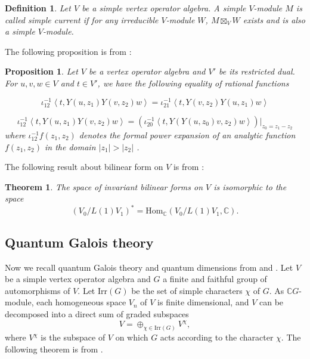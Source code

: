 \documentclass{article}
\newtheorem{theorem}[lemma]{Theorem}
\newtheorem{proposition}[lemma]{Proposition}
\newtheorem{definition}[lemma]{Definition}
\begin{document}
	\begin{definition} Let $V$ be a simple vertex operator algebra.
		A simple $V$-module $M$ is called \emph{simple current} if for
		any irreducible $V$-module $W$, $M\boxtimes_{V}W$ exists and is
		also a simple $V$-module. \end{definition}
	
	The following proposition is from \cite{FHL}:
	
	\begin{proposition} \label{extension property} Let $V$ be a vertex
		operator algebra and $V'$ be its restricted dual. For $u,v,w\in V$
		and $t\in V'$, we have the following equality of rational functions
		
		\begin{equation}
			\iota_{12}^{-1}\left\langle t,Y\left(u,z_{1}\right)Y\left(v,z_{2}\right)w\right\rangle =\iota_{21}^{-1}\left\langle t,Y\left(v,z_{2}\right)Y\left(u,z_{1}\right)w\right\rangle \label{communitivity}
		\end{equation}
		
		\begin{equation}
			\iota_{12}^{-1}\left\langle t,Y\left(u,z_{1}\right)Y\left(v,z_{2}\right)w\right\rangle =\left(\iota_{20}^{-1}\left\langle t,Y\left(Y\left(u,z_{0}\right)v,z_{2}\right)w\right\rangle \right)|_{z_{0}=z_{1}-z_{2}}\label{associavity}
		\end{equation}
		where $\iota_{12}^{-1}f\left(z_{1},z_{2}\right)$ denotes the formal
		power expansion of an analytic function $f\left(z_{1},z_{2}\right)$
		in the domain $\left|z_{1}\right|>\left|z_{2}\right|$ . \end{proposition}
	
	The following result about bilinear form on $V$ is from \cite{Li}:
	
	\begin{theorem}\label{bilinear form}The space of invariant bilinear
		forms on $V$ is isomorphic to the space
		\[
		\left(V_{0}/L\left(1\right)V_{1}\right)^{*}=\mbox{Hom}_{\mathbb{C}}\left(V_{0}/L\left(1\right)V_{1},\mathbb{C}\right).
		\]
	\end{theorem}
	
	\subsection{Quantum Galois theory}
	
	Now we recall quantum Galois theory and quantum dimensions from \cite{DM}
	and \cite{DJX}. Let $V$ be a simple vertex operator algebra and
	$G$ a finite and faithful group of automorphisms of $V$. Let $\text{Irr}\left(G\right)$
	be the set of simple characters $\chi$ of $G$. As $\mathbb{C}G$-module,
	each homogeneous space $V_{n}$ of $V$ is finite dimensional, and
	$V$ can be decomposed into a direct sum of graded subspaces
	\[
	V=\oplus_{\chi\in\text{Irr}\left(G\right)}V^{\chi},
	\]
	where $V^{\chi}$ is the subspace of $V$ on which $G$ acts according
	to the character $\chi$. The following theorem is from \cite{DM,DLM4}. 
	
\end{document}
